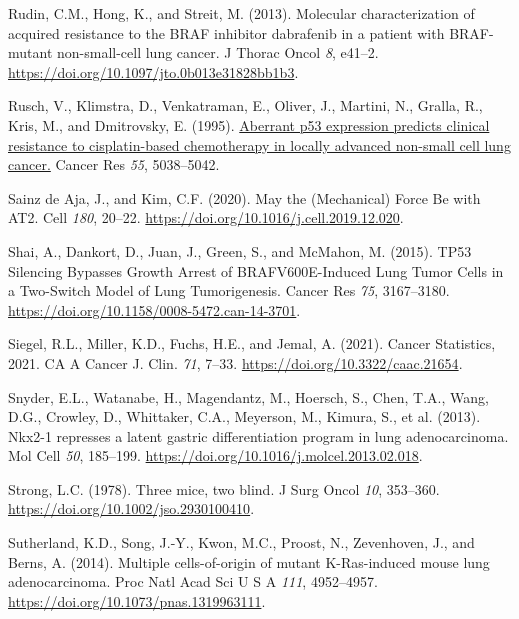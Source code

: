 \begin{CSLReferences}{0}{0}
\leavevmode{}%
Rudin, C.M., Hong, K., and Streit, M. (2013). Molecular characterization of acquired resistance to the BRAF inhibitor dabrafenib in a patient with BRAF-mutant non-small-cell lung cancer. J Thorac Oncol \emph{8}, e41--2. \url{https://doi.org/10.1097/jto.0b013e31828bb1b3}.

\leavevmode{}%
Rusch, V., Klimstra, D., Venkatraman, E., Oliver, J., Martini, N., Gralla, R., Kris, M., and Dmitrovsky, E. (1995). \href{https://www.ncbi.nlm.nih.gov/pubmed/7585548}{Aberrant p53 expression predicts clinical resistance to cisplatin-based chemotherapy in locally advanced non-small cell lung cancer.} Cancer Res \emph{55}, 5038--5042.

\leavevmode{}%
Sainz de Aja, J., and Kim, C.F. (2020). May the (Mechanical) Force Be with AT2. Cell \emph{180}, 20--22. \url{https://doi.org/10.1016/j.cell.2019.12.020}.

\leavevmode{}%
Shai, A., Dankort, D., Juan, J., Green, S., and McMahon, M. (2015). TP53 Silencing Bypasses Growth Arrest of BRAFV600E-Induced Lung Tumor Cells in a Two-Switch Model of Lung Tumorigenesis. Cancer Res \emph{75}, 3167--3180. \url{https://doi.org/10.1158/0008-5472.can-14-3701}.

\leavevmode{}%
Siegel, R.L., Miller, K.D., Fuchs, H.E., and Jemal, A. (2021). Cancer Statistics, 2021. CA A Cancer J. Clin. \emph{71}, 7--33. \url{https://doi.org/10.3322/caac.21654}.

\leavevmode{}%
Snyder, E.L., Watanabe, H., Magendantz, M., Hoersch, S., Chen, T.A., Wang, D.G., Crowley, D., Whittaker, C.A., Meyerson, M., Kimura, S., et al. (2013). Nkx2-1 represses a latent gastric differentiation program in lung adenocarcinoma. Mol Cell \emph{50}, 185--199. \url{https://doi.org/10.1016/j.molcel.2013.02.018}.

\leavevmode{}%
Strong, L.C. (1978). Three mice, two blind. J Surg Oncol \emph{10}, 353--360. \url{https://doi.org/10.1002/jso.2930100410}.

\leavevmode{}%
Sutherland, K.D., Song, J.-Y., Kwon, M.C., Proost, N., Zevenhoven, J., and Berns, A. (2014). Multiple cells-of-origin of mutant K-Ras-induced mouse lung adenocarcinoma. Proc Natl Acad Sci U S A \emph{111}, 4952--4957. \url{https://doi.org/10.1073/pnas.1319963111}.


\end{CSLReferences}
